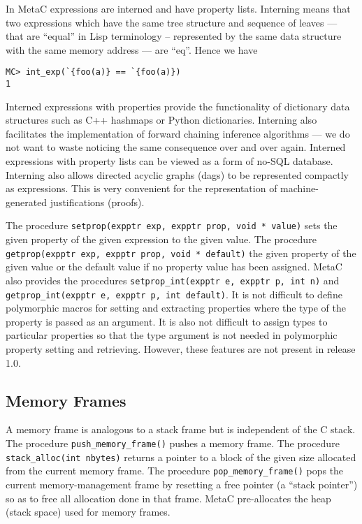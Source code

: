 \documentclass{article}
\begin{document}
In MetaC expressions are interned and have property lists.
Interning means that two expressions which have the same tree structure and sequence of leaves --- that are ``equal'' in Lisp terminology --
represented by the same data structure with the same memory address --- are ``eq''.
Hence we have
\begin{verbatim}
MC> int_exp(`{foo(a)} == `{foo(a)})
1
\end{verbatim}
Interned expressions with properties provide the functionality of dictionary data structures such as C++ hashmaps or Python dictionaries.
Interning also facilitates the implementation of forward chaining inference algorithms --- we do not want to waste noticing the same
consequence over and over again.  Interned expressions with property lists can be viewed as a form of no-SQL database.
Interning also allows directed acyclic graphs (dags) to be represented compactly as expressions.  This is very convenient
for the representation of machine-generated justifications (proofs).

The procedure {\tt setprop(expptr exp, expptr prop, void * value)}
sets the given property of the given expression to the given value.  The procedure {\tt getprop(expptr exp, expptr prop, void * default)}
the given property of the given value or the default value if no property value has been assigned.
MetaC also provides the procedures {\tt setprop\_int(expptr e, expptr p, int n)} and {\tt getprop\_int(expptr e, expptr p, int default)}.
It is not difficult to define polymorphic macros for setting and extracting properties where the type of the property is passed as an argument.
It is also not difficult to assign types to particular properties so that the type argument is not needed in polymorphic property setting and retrieving.
However, these features are not present in release 1.0.

\subsection{Memory Frames}

A memory frame is analogous to a stack frame but is independent of the C stack.
The procedure {\tt push\_memory\_frame()} pushes a memory frame.  The procedure {\tt stack\_alloc(int nbytes)}
returns a pointer to a block of the given size allocated from the current memory frame.  The procedure {\tt pop\_memory\_frame()}
pops the current memory-management frame by resetting a free pointer (a ``stack pointer'') so as to free all allocation done in that frame.
MetaC pre-allocates the heap (stack space) used for memory frames.
\end{document}
